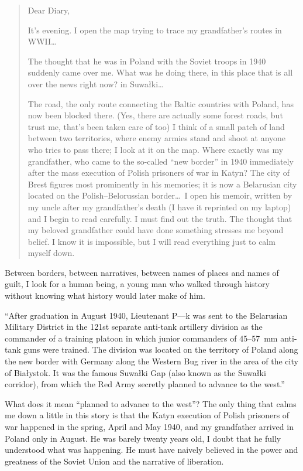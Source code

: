 \begin{quotation}
  
Dear Diary,

\medskip

It's evening. I open the map trying to trace my grandfather's routes in WWII\ldots 

The thought that he was in Poland with the Soviet troops in 1940
suddenly came over me. What was he doing there, in this place that is
all over the news right now? in Suwa{\l}ki\ldots

The road, the only route connecting the Baltic countries with Poland,
has now been blocked there. (Yes, there are actually some forest
roads, but trust me, that's been taken care of too) I think of a small
patch of land between two territories, where enemy armies stand and
shoot at anyone who tries to pass there; I look at it on the
map. Where exactly was my grandfather, who came to the so-called ``new
border'' in 1940 immediately after the mass execution of Polish
prisoners of war in Katyn? The city of Brest figures most prominently
in his memories; it is now a Belarusian city located on the
Polish--Belorussian border\ldots\ I open his memoir, written by my uncle
after my grandfather's death (I have it reprinted on my laptop) and I
begin to read carefully. I must find out the truth. The thought that
my beloved grandfather could have done something stresses me
beyond belief. I know it is impossible, but I will read everything
just to calm myself down.

\end{quotation}

Between borders, between narratives, between names of places and names of guilt,
I look for a human being, a young man who walked through history without knowing
what history would later make of him.

``After graduation in August 1940, Lieutenant P---k was sent to the
Belarusian Military District in the 121st separate anti-tank artillery
division as the commander of a training platoon in which junior
commanders of 45--57~mm anti-tank guns were trained. The division was
located on the territory of Poland along the new border with Germany
along the Western Bug river in the area of the city of Białystok. It
was the famous Suwałki Gap (also known as the Suwałki corridor), from
which the Red Army secretly planned to advance to the west.''

What does it mean ``planned to advance to the west''? The only thing
that calms me down a little in this story is that the Katyn execution
of Polish prisoners of war happened in the spring, April and May 1940,
and my grandfather arrived in Poland only in August. He was barely
twenty years old, I doubt that he fully understood what was
happening. He must have naively believed in the power and greatness of
the Soviet Union and the narrative of liberation.

